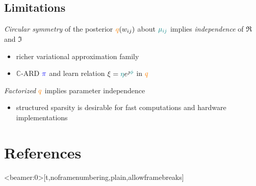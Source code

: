 \documentclass{beamer}
\newcommand{\cplx}{\mathbb{C}}
\newcommand{\iu}{{\jmath}}
\begin{document}

\subsection{Limitations} %
\label{sec:limitations}

\begin{frame}[c]{\insertsubsection}{\insertsection}

  \emph{Circular symmetry} of the posterior ${\color{orange} q}(w_{ij})$ about
  ${\color{teal} \mu_{ij}}$ implies \emph{independence} of $\Re$ and $\Im$
  \begin{itemize}
    \item richer variational approximation family
    \item $\cplx$-ARD ${\color{blue} \pi}$ and learn relation $
      \xi = {\color{teal} \eta} e^{\iu {\color{teal} \phi}}
    $ in ${\color{orange} q}$
  \end{itemize}

  \bigskip

  \pause
  \bigskip
  \emph{Factorized} ${\color{orange} q}$ implies parameter independence %
  \begin{itemize}
    \item structured sparsity is desirable for fast computations and hardware implementations
  \end{itemize}

\end{frame}



\section{References} %
\label{sec:references}

\begin{frame}<beamer:0>[t,noframenumbering,plain,allowframebreaks]{\insertsection}
  \tiny
  
  
\end{frame}
\end{document}
